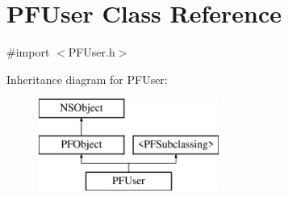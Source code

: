 \hypertarget{interface_p_f_user}{}\section{P\+F\+User Class Reference}
\label{interface_p_f_user}


{\ttfamily \#import $<$P\+F\+User.\+h$>$}

Inheritance diagram for P\+F\+User\+:\begin{figure}[H]
\begin{center}
\leavevmode
\includegraphics[height=3.000000cm]{interface_p_f_user}
\end{center}
\end{figure}
